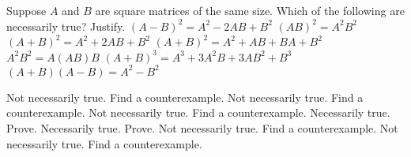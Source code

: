 
\begin{Exercise}[
name={},
title={}, 
difficulty=0,
origin={\cite{KK}}]
Suppose $A$ and $B$ are square matrices of the same size. Which of the
following are necessarily true? Justify.
\Question $\left( A-B\right) ^{2}=A^{2}-2AB+B^{2}$
\Question $\left( AB\right) ^{2}=A^{2}B^{2}$
\Question $\left( A+B\right) ^{2}=A^{2}+2AB+B^{2}$
\Question $\left( A+B\right) ^{2}=A^{2}+AB+BA+B^{2}$
\Question $A^{2}B^{2}=A\left( AB\right) B$
\Question $\left( A+B\right) ^{3}=A^{3}+3A^{2}B+3AB^{2}+B^{3}$
\Question $\left( A+B\right) \left( A-B\right) =A^{2}-B^{2}$
\end{Exercise}

\begin{Answer}
\Question Not necessarily true. Find a counterexample.
\Question Not necessarily true. Find a counterexample.
\Question Not necessarily true. Find a counterexample.
\Question Necessarily true. Prove.
\Question Necessarily true. Prove.
\Question Not necessarily true. Find a counterexample.
\Question Not necessarily true. Find a counterexample.


\end{Answer}
